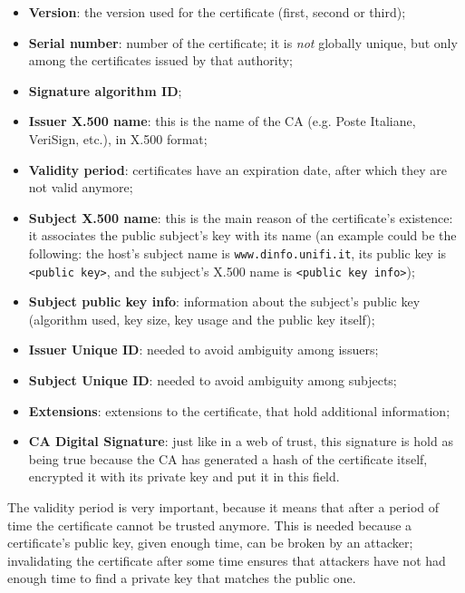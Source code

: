 \begin{itemize}
    \item \textbf{Version}: the version used for the certificate (first, second or third);
    \item \textbf{Serial number}: number of the certificate; it is \textit{not} globally unique, but only among the certificates issued by that authority;
    \item \textbf{Signature algorithm ID};
    \item \textbf{Issuer X.500 name}: this is the name of the CA (e.g. Poste Italiane, VeriSign, etc.), in X.500 format;
    \item \textbf{Validity period}: certificates have an expiration date, after which they are not valid anymore;
    \item \textbf{Subject X.500 name}: this is the main reason of the certificate's existence: it associates the public subject's key with its name (an example could be the following: the host's subject name is \texttt{www.dinfo.unifi.it}, its public key is \texttt{<public key>}, and the subject's X.500 name is \texttt{<public key info>});
    \item \textbf{Subject public key info}: information about the subject's public key (algorithm used, key size, key usage and the public key itself);
    \item \textbf{Issuer Unique ID}: needed to avoid ambiguity among issuers;
    \item \textbf{Subject Unique ID}: needed to avoid ambiguity among subjects;
    \item \textbf{Extensions}: extensions to the certificate, that hold additional information;
    \item \textbf{CA Digital Signature}: just like in a web of trust, this signature is hold as being true because the CA has generated a hash of the certificate itself, encrypted it with its private key and put it in this field.
\end{itemize}

The validity period is very important, because it means that after a period of time the certificate cannot be trusted anymore. This is needed because a certificate's public key, given enough time, can be broken by an attacker; invalidating the certificate after some time ensures that attackers have not had enough time to find a private key that matches the public one.


